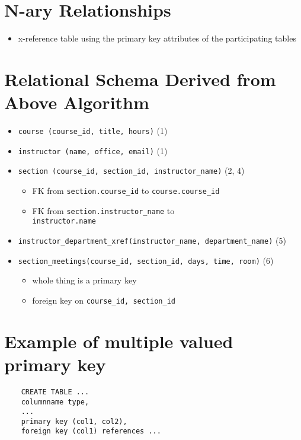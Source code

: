\documentclass{../cheatsheet}
\begin{document}
\begin{multicols*}{2}
    \section{N-ary Relationships}
    \begin{itemize}
        \item x-reference table using the primary key attributes of the
            participating tables
    \end{itemize}

    \section{Relational Schema Derived from Above Algorithm}
    \begin{itemize}
        \item \texttt{course (course\_id, title, hours)} (1)
        \item \texttt{instructor (name, office, email)} (1)
        \item \texttt{section (course\_id, section\_id, instructor\_name)} (2, 4)
            \begin{itemize}
                \item FK from \texttt{section.course\_id} to \texttt{course.course\_id}
                \item FK from \texttt{section.instructor\_name} to \\
                    \texttt{instructor.name}
            \end{itemize}
        \item \texttt{instructor\_department\_xref(instructor\_name,
            department\_name)} (5)
        \item \texttt{section\_meetings(course\_id, section\_id, days, time, room)} (6)
            \begin{itemize}
                \item whole thing is a primary key
                \item foreign key on \texttt{course\_id, section\_id}
            \end{itemize}
    \end{itemize}

    \section{Example of multiple valued primary key}
    \begin{verbatim}
    CREATE TABLE ...
    columnname type,
    ...
    primary key (col1, col2),
    foreign key (col1) references ...
    \end{verbatim}


\end{multicols*}
\end{document}
